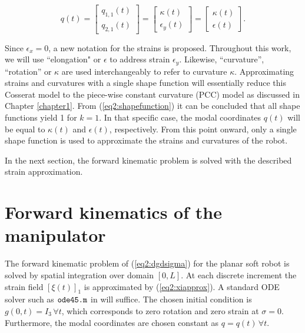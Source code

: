 \begin{equation}
q(t) = \begin{bmatrix} q_{1,1}(t) \\ q_{2,1}(t) \end{bmatrix} = \begin{bmatrix} \kappa(t) \\ \epsilon_y(t) \end{bmatrix} = \begin{bmatrix} \kappa(t) \\ \epsilon(t) \end{bmatrix}.
\end{equation}

Since $\epsilon_x = 0$, a new notation for the strains is proposed. Throughout this work, we will use ``elongation" or $\epsilon$ to address strain $\epsilon_y$. Likewise, ``curvature'', ``rotation'' or  $\kappa$ are used interchangeably to refer to curvature $\kappa$. Approximating strains and curvatures with a single shape function will essentially reduce this Cosserat model to the piece-wise constant curvature (PCC) model as discussed in Chapter \ref{chapter1}. From (\ref{eq2:shapefunction}) it can be concluded that all shape functions yield 1 for $k=1$. In that specific case, the modal coordinates $q(t)$ will be equal to $\kappa(t)$ and $\epsilon(t)$, respectively. From this point onward, only a single shape function is used to approximate the strains and curvatures of the robot. 

In the next section, the forward kinematic problem is solved with the described strain approximation.




\section{Forward kinematics of the manipulator}

The forward kinematic problem of (\ref{eq2:dgdsigma}) for the
planar soft robot is solved by spatial integration over domain $[0,L]$. At each discrete increment the strain field $[\xi(t)]_1$ is approximated by (\ref{eq2:xiapprox}). A standard ODE solver such as $\verb+ode45.m+$ in \MATLAB \cite{MATLAB2020} will suffice. The chosen initial condition is $g(0,t) = I_3 \hspace{2pt} \forall t$, which corresponds to zero rotation and zero strain at $\sigma = 0$. Furthermore, the modal coordinates are chosen constant as $q = q(t) \hspace{2pt} \forall t$. 

